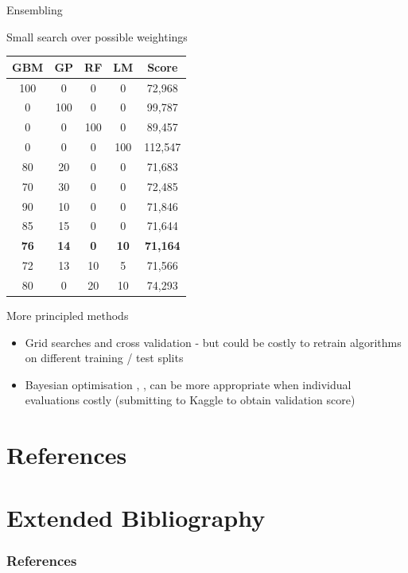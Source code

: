 \begin{frame}{Ensembling}
  \begin{block}{Small search over possible weightings}
    \begin{center}
      \scriptsize
      \begin{tabular}{cccc|c}
        GBM & GP & RF & LM & Score \\
        \hline
        100 & 0 & 0 & 0 & 72,968 \\
        0 & 100 & 0 & 0 & 99,787 \\
        0 & 0 & 100 & 0 & 89,457 \\
        0 & 0 & 0 & 100 & 112,547 \\
        80 & 20 & 0 & 0 & 71,683 \\
        70 & 30 & 0 & 0 & 72,485 \\
        90 & 10 & 0 & 0 & 71,846 \\
        85 & 15 & 0 & 0 & 71,644 \\
        \bf{76} & \bf{14} & \bf{0} & \bf{10} & \bf{71,164} \\
        72 & 13 & 10 & 5 & 71,566 \\
        80 & 0 & 20 & 10 & 74,293 \\
      \end{tabular}
    \end{center}
  \end{block}
  \begin{block}{More principled methods}
    \begin{itemize}
      \item Grid searches and cross validation - but could be costly to retrain algorithms on different training / test splits
      \item Bayesian optimisation \cite{Osborne2009}, \cite{snoek2012practical}, \cite{Hennig} can be more appropriate when individual evaluations costly (\eg submitting to Kaggle to obtain validation score)
    \end{itemize}
  \end{block}
\end{frame}

{
\section{References}
\section{Extended Bibliography}
\tiny
\begin{frame}
  \frametitle{References}
  
  
\end{frame}
}

